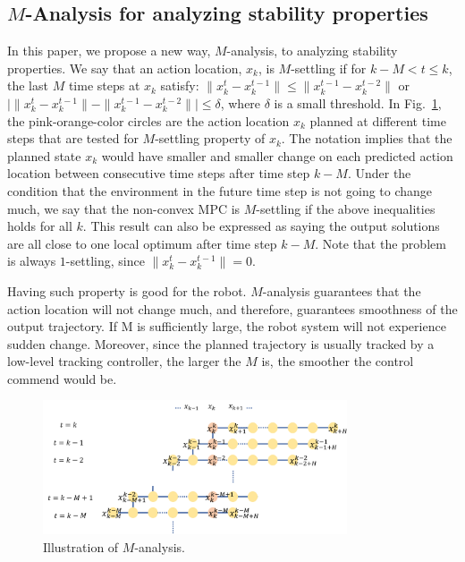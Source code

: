 \documentclass[letterpaper, 10 pt, conference]{ieeeconf}  %
\begin{document}
\subsection{$M$-Analysis for analyzing stability properties}
In this paper, we propose a new way, $M$-analysis, to analyzing stability properties.
We say that an action location, $x_{k}$, is $M$-settling if for $k-M< t\leq k$, the last $M$ time steps at $x_{k}$ satisfy: $\|x_{k}^t-x_k^{t-1}\|\leq \|x_k^{t-1}-x_k^{t-2}\|$ or $\bigl|\|x_{k}^t-x_k^{t-1}\|-\|x_k^{t-1}-x_k^{t-2}\|\bigr|\leq \delta$, where $\delta$ is a small threshold. In Fig.~\ref{fig:m-stable}, the pink-orange-color circles are the action location $x_{k}$ planned at different time steps that are  tested for $M$-settling property of $x_{k}$. The notation implies that the planned state $x_k$ would have smaller and smaller change on each predicted action location between consecutive time steps after time step $k-M$. Under the condition that the environment in the future time step is not going to change much, we say that the non-convex MPC is $M$-settling if the above inequalities holds for all $k$. This result can also be expressed as saying the output solutions are all close to one local optimum after time step $k-M$. Note that the problem is always $1$-settling, since $\|x_{k}^t-x_k^{t-1}\|=0$.

Having such property is good for the robot. $M$-analysis guarantees that the action location will not change much, and therefore, guarantees smoothness of the output trajectory. If M is sufficiently large, the robot system will not experience sudden change. Moreover, since the planned trajectory is usually tracked by a low-level tracking controller, the larger the $M$ is, the smoother the control commend would be.

\begin{figure}[t]
\begin{center}
\includegraphics[width=9cm]{src/Mstable.png}
\caption{Illustration of $M$-analysis.}
\label{fig:m-stable}
\end{center}
\end{figure}
\end{document}
